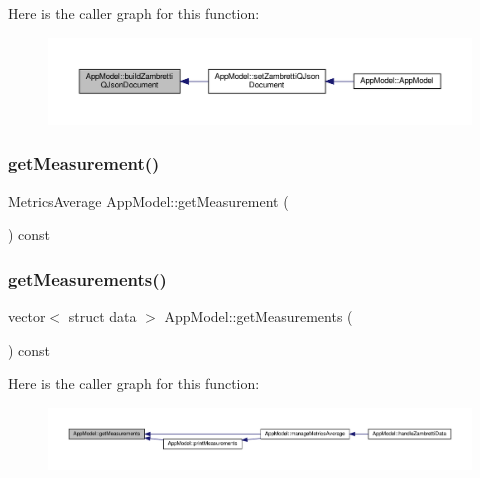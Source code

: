 Here is the caller graph for this function\+:\nopagebreak
\begin{figure}[H]
\begin{center}
\leavevmode
\includegraphics[width=350pt]{class_app_model_a2e738230cd01012b529adadc3f7c4eae_icgraph}
\end{center}
\end{figure}
\mbox{\label{class_app_model_ac9dff9ffdd21a1749d2461c3d2587f6a}} 
\subsubsection{\texorpdfstring{get\+Measurement()}{getMeasurement()}}
{\footnotesize\ttfamily Metrics\+Average App\+Model\+::get\+Measurement (\begin{DoxyParamCaption}{ }\end{DoxyParamCaption}) const}

\mbox{\label{class_app_model_aeb65a362d2a2875ed038dc1ae359a337}} 
\subsubsection{\texorpdfstring{get\+Measurements()}{getMeasurements()}}
{\footnotesize\ttfamily vector$<$ struct data $>$ App\+Model\+::get\+Measurements (\begin{DoxyParamCaption}{ }\end{DoxyParamCaption}) const}

Here is the caller graph for this function\+:\nopagebreak
\begin{figure}[H]
\begin{center}
\leavevmode
\includegraphics[width=350pt]{class_app_model_aeb65a362d2a2875ed038dc1ae359a337_icgraph}
\end{center}
\end{figure}
\mbox{\label{class_app_model_a1e221ad7947cc08e85078416afc5a593}} 

